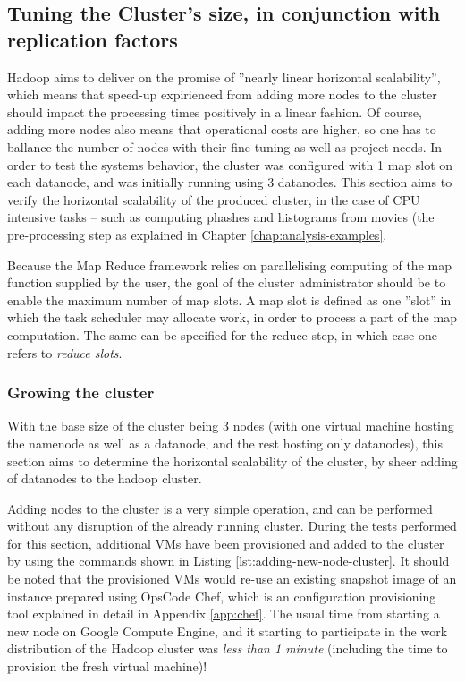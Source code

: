 \subsection{Tuning the Cluster's size, in conjunction with replication factors}
\label{sec:tuning-number-of-nodes}
Hadoop aims to deliver on the promise of ''nearly linear horizontal scalability'', which means that speed-up expirienced from adding more nodes to the cluster should impact the processing times positively in a linear fashion. Of course, adding more nodes also means that operational costs are higher, so one has to ballance the number of nodes with their fine-tuning as well as project needs. In order to test the systems behavior, the cluster was configured with 1 map slot on each datanode, and was initially running using 3 datanodes. This section aims to verify the horizontal scalability of the produced cluster, in the case of CPU intensive tasks -- such as computing phashes and histograms from movies (the pre-processing step as explained in Chapter \ref{chap:analysis-examples}.

Because the Map Reduce framework relies on parallelising computing of the map function supplied by the user, the goal of the cluster administrator should be to enable the maximum number of map slots. A map slot is defined as one ''slot'' in which the task scheduler may allocate work, in order to process a part of the map computation. The same can be specified for the reduce step, in which case one refers to \textit{reduce slots}.

\subsubsection{Growing the cluster}
\label{sec:growing-the-cluster}
With the base size of the cluster being 3 nodes (with one virtual machine hosting the namenode as well as a datanode, and the rest hosting only datanodes), this section aims to determine the horizontal scalability of the cluster, by sheer adding of datanodes to the hadoop cluster.

Adding nodes to the cluster is a very simple operation, and can be performed without any disruption of the already running cluster. During the tests performed for this section, additional VMs have been provisioned and added to the cluster by using the commands shown in Listing \ref{lst:adding-new-node-cluster}. It should be noted that the provisioned VMs would re-use an existing snapshot image of an instance prepared using OpsCode Chef, which is an configuration provisioning tool explained in detail in Appendix \ref{app:chef}. The usual time from starting a new node on Google Compute Engine, and it starting to participate in the work distribution of the Hadoop cluster was \textit{less than 1 minute} (including the time to provision the fresh virtual machine)!

